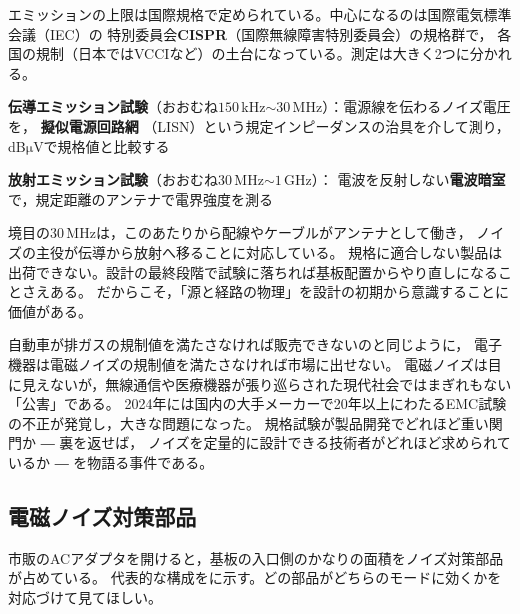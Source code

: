 エミッションの上限は国際規格で定められている。中心になるのは国際電気標準会議（IEC）の
特別委員会\textbf{CISPR}（国際無線障害特別委員会）の規格群で，
各国の規制（日本ではVCCIなど）の土台になっている。測定は大きく2つに分かれる。

\begin{箇条書}
\item \textbf{伝導エミッション試験}（おおむね$150$\,kHz$\sim$$30$\,MHz）：電源線を伝わるノイズ電圧を，
\textbf{擬似電源回路網}
（LISN）という規定インピーダンスの治具を介して測り，dB$\mathrm{\mu}$Vで規格値と比較する
\item \textbf{放射エミッション試験}（おおむね$30$\,MHz$\sim$$1$\,GHz）：
電波を反射しない\textbf{電波暗室}で，規定距離のアンテナで電界強度を測る
\end{箇条書}

境目の$30$\,MHzは，このあたりから配線やケーブルがアンテナとして働き，
ノイズの主役が伝導から放射へ移ることに対応している。
規格に適合しない製品は出荷できない。設計の最終段階で試験に落ちれば基板配置からやり直しになることさえある。
だからこそ，「源と経路の物理」を設計の初期から意識することに価値がある。

\begin{COLUMN}

自動車が排ガスの規制値を満たさなければ販売できないのと同じように，
電子機器は電磁ノイズの規制値を満たさなければ市場に出せない。
電磁ノイズは目に見えないが，無線通信や医療機器が張り巡らされた現代社会ではまぎれもない「公害」である。
2024年には国内の大手メーカーで20年以上にわたるEMC試験の不正が発覚し，大きな問題になった。
規格試験が製品開発でどれほど重い関門か ― 裏を返せば，
ノイズを定量的に設計できる技術者がどれほど求められているか ― を物語る事件である。
\end{COLUMN}

\subsection{電磁ノイズ対策部品}

市販のACアダプタを開けると，基板の入口側のかなりの面積をノイズ対策部品が占めている。
代表的な構成をに示す。どの部品がどちらのモードに効くかを対応づけて見てほしい。

